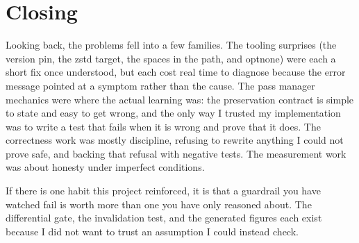 \section{Closing}

Looking back, the problems fell into a few families. The tooling surprises (the
version pin, the zstd target, the spaces in the path, and optnone) were each a
short fix once understood, but each cost real time to diagnose because the error
message pointed at a symptom rather than the cause. The pass manager mechanics
were where the actual learning was: the preservation contract is simple to state
and easy to get wrong, and the only way I trusted my implementation was to write
a test that fails when it is wrong and prove that it does. The correctness work
was mostly discipline, refusing to rewrite anything I could not prove safe, and
backing that refusal with negative tests. The measurement work was about honesty
under imperfect conditions.

If there is one habit this project reinforced, it is that a guardrail you have
watched fail is worth more than one you have only reasoned about. The differential
gate, the invalidation test, and the generated figures each exist because I did
not want to trust an assumption I could instead check.
